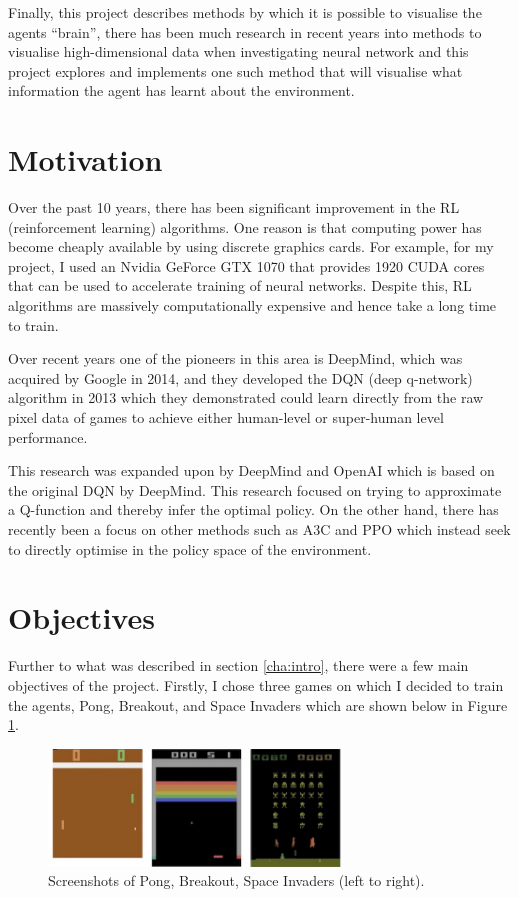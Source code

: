 Finally, this project describes methods by which it is possible to visualise the agents ``brain'', there has been much research in recent years into methods to visualise high-dimensional data when investigating neural network and this project explores and implements one such method that will visualise what information the agent has learnt about the environment.

\section{Motivation}
\label{intro:sec:moti}
Over the past 10 years, there has been significant improvement in the RL (reinforcement learning) algorithms. One reason is that computing power has become cheaply available by using discrete graphics cards. For example, for my project, I used an Nvidia GeForce GTX 1070 that provides 1920 CUDA cores that can be used to accelerate training of neural networks. Despite this, RL algorithms are massively computationally expensive and hence take a long time to train.

Over recent years one of the pioneers in this area is DeepMind, which was acquired by Google in 2014, and they developed the DQN (deep q-network) algorithm in 2013 which they demonstrated could learn directly from the raw pixel data of games to achieve either human-level or super-human level performance.

This research was expanded upon by DeepMind and OpenAI which is based on the original DQN by DeepMind. This research focused on trying to approximate a Q-function and thereby infer the optimal policy. On the other hand, there has recently been a focus on other methods such as A3C and PPO which instead seek to directly optimise in the policy space of the environment.

\section{Objectives}
\label{intro:sec:obj}
Further to what was described in section \ref{cha:intro}, there were a few main objectives of the project. Firstly, I chose three games on which I decided to train the agents, Pong, Breakout, and Space Invaders which are shown below in Figure \ref{fig:atari-screenshot}.

\begin{figure}[htbp]
  \centering
  \includegraphics[width=0.7\textwidth]{chapters/chapter1/images/atari-combined.jpg}
  \caption{Screenshots of Pong, Breakout, Space Invaders (left to right).
    \label{fig:atari-screenshot}
  }
\end{figure}

